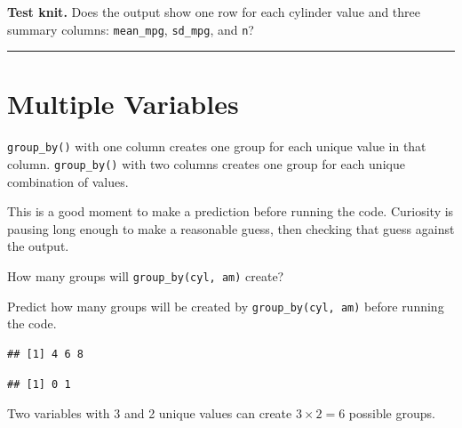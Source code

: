 \documentclass[
]{article}
\newenvironment{Shaded}{\begin{snugshade}}{\end{snugshade}}
\newcommand{\CommentTok}[1]{\textcolor[rgb]{0.56,0.35,0.01}{\textit{#1}}}
\newcommand{\FunctionTok}[1]{\textcolor[rgb]{0.13,0.29,0.53}{\textbf{#1}}}
\newcommand{\NormalTok}[1]{#1}
\newcommand{\SpecialCharTok}[1]{\textcolor[rgb]{0.81,0.36,0.00}{\textbf{#1}}}
\begin{document}
\textbf{Test knit.} Does the output show one row for each cylinder value
and three summary columns: \texttt{mean\_mpg}, \texttt{sd\_mpg}, and
\texttt{n}?

\begin{center}\rule{0.5\linewidth}{0.5pt}\end{center}

\section{Multiple Variables}\label{multiple-vars}

\texttt{group\_by()} with one column creates one group for each unique
value in that column. \texttt{group\_by()} with two columns creates one
group for each unique combination of values.

This is a good moment to make a prediction before running the code.
Curiosity is pausing long enough to make a reasonable guess, then
checking that guess against the output.

How many groups will \texttt{group\_by(cyl,\ am)} create?

Predict how many groups will be created by \texttt{group\_by(cyl,\ am)}
before running the code.

\begin{Shaded}
\end{Shaded}

\begin{verbatim}
## [1] 4 6 8
\end{verbatim}

\begin{Shaded}
\end{Shaded}

\begin{verbatim}
## [1] 0 1
\end{verbatim}

Two variables with 3 and 2 unique values can create \(3 \times 2 = 6\)
possible groups.
\end{document}
